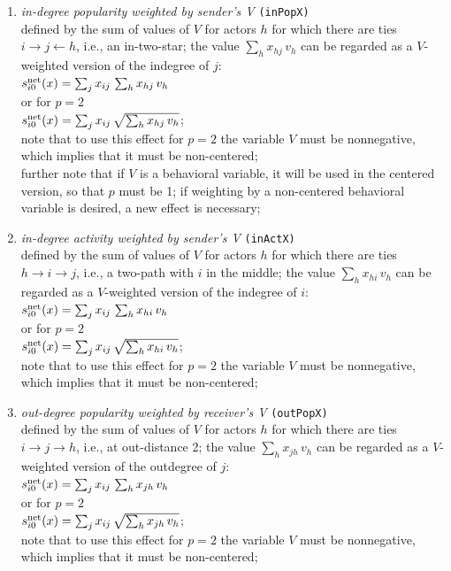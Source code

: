 \documentclass[a4paper,fleqn,11pt]{article}
\newcommand{\+}{\, + \,}
\newcommand{\vit}{\theenumi}
\begin{document}
\begin{enumerate}
 \item {\em in-degree popularity weighted by sender's V }
  \texttt{(inPopX)}\\
 defined by the sum of values of $V$ for actors $h$
 for which there are ties  $ i \rightarrow j \leftarrow h$,
 i.e., an in-two-star;
 the value $\sum_h x_{hj}\,v_h$ can be regarded as a $V$-weighted
 version of the indegree of $j$:\\
 $s^{\rm net}_{i\vit}(x) =  \sum_j x_{ij}\, \sum_h x_{hj}\,v_h  $ \\
 or for $p=2$ \\
   $s^{\rm net}_{i\vit}(x) =  \sum_j x_{ij}\, \sqrt{\sum_h x_{hj}\,v_h}   $;\\
 note that to use this effect for $p=2$ the variable $V$ must be nonnegative,
 which implies that it must be non-centered;\\
 further note that if $V$ is a behavioral variable, it will be used
 in the centered version, so that $p$ must be 1; if weighting by
 a non-centered behavioral variable is desired, a new effect is necessary;

 \item {\em in-degree activity weighted by sender's V } \texttt{(inActX)}\\
 defined by the sum of values of $V$ for actors $h$
 for which there are ties  $h \rightarrow i \rightarrow j$,
 i.e., a two-path with $i$ in the middle;
 the value $\sum_h x_{hi}\,v_h$ can be regarded as a $V$-weighted
 version of the indegree of $i$:\\
 $s^{\rm net}_{i\vit}(x) =  \sum_j x_{ij}\, \sum_h x_{hi}\,v_h  $ \\
 or for $p=2$ \\
   $s^{\rm net}_{i\vit}(x) =  \sum_j x_{ij}\, \sqrt{\sum_h x_{hi}\,v_h}   $;\\
 note that to use this effect for $p=2$ the variable $V$ must be nonnegative,
 which implies that it must be non-centered;


 \item {\em out-degree popularity weighted by receiver's V }  \texttt{(outPopX)}\\
 defined by the sum of values of $V$ for actors $h$
 for which there are ties  $ i \rightarrow j \rightarrow h$,
 i.e., at out-distance 2;
 the value $\sum_h x_{jh}\,v_h$ can be regarded as a $V$-weighted
 version of the outdegree of $j$:\\
 $s^{\rm net}_{i\vit}(x) =  \sum_j x_{ij}\, \sum_h x_{jh}\,v_h  $ \\
 or for $p=2$ \\
   $s^{\rm net}_{i\vit}(x) =  \sum_j x_{ij}\, \sqrt{\sum_h x_{jh}\,v_h}   $;\\
 note that to use this effect for $p=2$ the variable $V$ must be nonnegative,
 which implies that it must be non-centered;


\end{enumerate}
\end{document}
